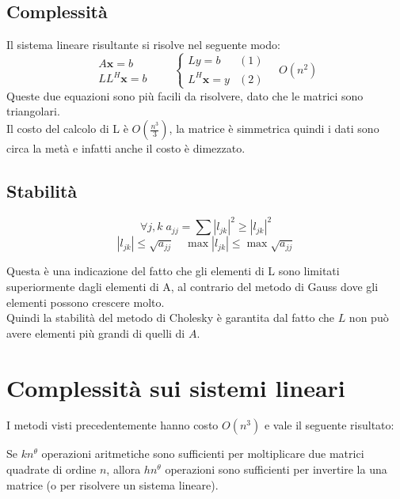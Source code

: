\subsection{Complessit\`a}
Il sistema lineare risultante si risolve nel seguente modo: \\
\[
\begin{array}{l}
  A\mathbf{x} = b                                                    \\ 
  LL^{H}\mathbf{x} =b
\end{array}
\qquad
\left\{
\begin{array}{ll}
Ly = b     & (1)\\
L^{H}\mathbf{x} = y & (2)
\end{array}
\quad O(n^2)
 \right.
\]
Queste due equazioni sono più facili da risolvere, dato che le matrici
sono triangolari.                                           \\
Il costo del calcolo di L \`e $O(\frac{n^3}{3})$, la matrice \`e
simmetrica quindi i dati sono circa la met\`a e infatti anche il costo \`e
dimezzato.


\subsection{Stabilit\`a}
$$ \forall j,k \; a_{jj} = \displaystyle \sum | l_{jk}|^{2} \geq |l_{jk}|^2  $$
$$ | l_{jk} | \leq \sqrt{a_{jj}} \quad \max|l_{jk}| \leq \max \sqrt{a_{jj}}$$

Questa \`e una indicazione del fatto che gli elementi di L sono limitati superiormente
dagli elementi di A, al contrario del metodo di Gauss dove gli
elementi possono crescere molto.\\
Quindi la stabilit\`a del metodo di Cholesky \`e garantita dal fatto che
$L$ non può avere elementi più grandi di quelli di $A$.



\section{Complessit\`a  sui sistemi lineari}
I metodi visti precedentemente hanno costo $O(n^3)$ e vale il seguente risultato:

\begin{theo}
  Se $kn^{\theta}$ operazioni aritmetiche sono sufficienti per
  moltiplicare due matrici quadrate di ordine $n$, allora
  $hn^{\theta}$ operazioni sono sufficienti per invertire la una
  matrice (o per risolvere un sistema lineare).
\end{theo}

